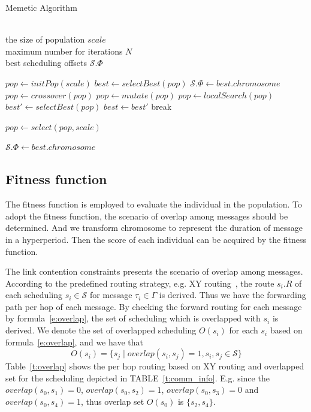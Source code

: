 \documentclass[journal]{IEEEtran}
\newcommand{\calS}{\mathcal{S}}
\theoremstyle{remark}
\begin{document}
\begin{algorithm}[tb]
\caption{Memetic Algorithm}
\renewcommand{\algorithmicrequire}{\textbf{Input:}}
\renewcommand{\algorithmicensure}{\textbf{Output:}}
\begin{algorithmic}[1]
  \REQUIRE~~\\
  the size of population $scale$\\
  maximum number for iterations $N$
  \ENSURE~~\\
  best scheduling offsets $\calS.\Phi$
  
  \STATE $pop \gets initPop(scale)$
  \STATE $best \gets selectBest(pop)$
    \RETURN $\calS.\Phi \gets best.chromosome$
  \ENDIF
    \STATE $pop \gets crossover(pop)$
    \STATE $pop \gets mutate(pop)$
    \STATE $pop \gets localSearch(pop)$
    \STATE $best' \gets selectBest(pop)$
      \STATE $best \gets best'$
    \ENDIF    
      \STATE break
    \ENDIF

    \STATE $pop \gets select(pop, scale)$
  \ENDFOR

  \RETURN $\calS.\Phi \gets best.chromosome$
\end{algorithmic}
\end{algorithm}	

\subsection{Fitness function \label{s:fit}}

The fitness function is employed to evaluate the individual in the population.
To adopt the fitness function, 
the scenario of overlap among messages should be determined.
And we transform chromosome to represent the duration of message in a hyperperiod.
Then the score of each individual can be acquired by the fitness function.

The link contention constraints presents the scenario of overlap among messages.
According to the predefined routing strategy,
e.g. XY routing~\cite{DBLP:books/daglib/0087651},
the route $s_i.R$ of each scheduling $s_i\in \calS$ for message $\tau_i\in\Gamma$ is derived.
Thus we have the forwarding path per hop of each message.
By checking the forward routing for each message by formula~\ref{e:overlap},
the set of scheduling which is overlapped with $s_i$ is derived.
We denote the set of overlapped scheduling $O(s_i)$ for each $s_i$ based on formula~\ref{e:overlap},
and we have that
\begin{equation}
O(s_i) = \{ s_j \mid overlap(s_i,s_j)=1,s_i,s_j\in \calS  \}
\end{equation}
Table~\ref{t:overlap} shows the per hop routing based on XY routing and overlapped set for the scheduling depicted in TABLE~\ref{t:comm_info}.
E.g. since the $overlap(s_{0},s_{1})=0$, $overlap(s_{0},s_{2})=1$, $overlap(s_{0},s_{3})=0$ and $overlap(s_{0},s_{4})=1$, thus overlap set $O(s_{0})$ is $\{ s_{2},s_{4} \}$. 
\end{document}
